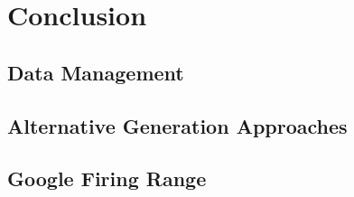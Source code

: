 \documentclass[letterpaper,twocolumn,10pt]{article}
\begin{document}
\section{Conclusion}

\subsection{\Ourscriptname {}}

\subsection{Data Management}

\subsection{Alternative Generation Approaches}

\subsection{Google Firing Range}
\end{document}
